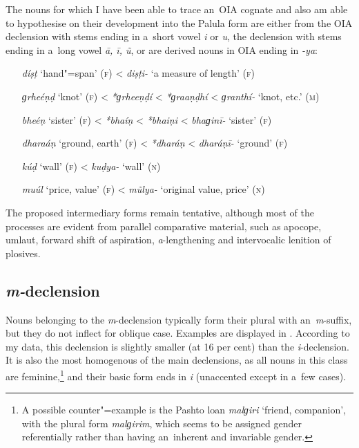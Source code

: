 The nouns for which I have been able to trace an~OIA cognate and also am able to hypothesise on their development into the Palula form are either from the OIA declension with stems ending in a~short vowel \textit{i} or \textit{u}, the declension with stems ending in a~long vowel \textit{ā, ī, ũ}, or are derived nouns in OIA ending in \textit{-ya}: 

\begin{itemize}[itemsep=0pt, leftmargin=]
\item[\textit{díṣṭ} `hand"=span' (\textsc{f})] {\textless} \textit{diṣṭi-} `a measure of length' (\textsc{f})
\item[\textit{ɡrheéṇḍ} `knot' (\textsc{f})] {\textless} \textit{*ɡrheeṇḍí} {\textless} \textit{*ɡraaṇḍhí} {\textless} \textit{ɡranthí-} `knot, etc.' (\textsc{m})
\item[\textit{bheéṇ} `sister' (\textsc{f})] {\textless} \textit{*bhaíṇ} {\textless} \textit{*bhaiṇi} {\textless} \textit{bhaɡinī-} `sister' (\textsc{f})
\item[\textit{dharaáṇ} `ground, earth' (\textsc{f})] {\textless} \textit{*dharáṇ} {\textless} \textit{dharáṇī-} `ground' (\textsc{f})
\item[\textit{kúḍ} `wall' (\textsc{f})] {\textless} \textit{kuḍya-} `wall' (\textsc{n})
\item[\textit{muúl} `price, value' (\textsc{f})] {\textless} \textit{mũlya-} `original value, price' (\textsc{n})
\end{itemize}

The proposed intermediary forms remain tentative, although most of the processes are evident from parallel comparative material, such as apocope, umlaut, forward shift of aspiration, \textit{a}-lengthening and intervocalic lenition of plosives.

\subsection{\textit{m-}declension}
\label{subsec:4-6-3}

Nouns belonging to the \textit{m}-declension typically form their plural with an~\textit{m}-suffix, but they do not inflect for oblique case. Examples are displayed in . According to my data, this declension is slightly smaller (at 16 per cent) than the \textit{i}-declension. It is also the most homogenous of the main declensions, as all nouns in this class are feminine,\footnote{A possible counter"=example is the Pashto loan \textit{malɡiri} `friend, companion', with the plural form \textit{malɡirim}, which seems to be assigned gender referentially rather than having an~inherent and invariable gender.} and their basic form ends in \textit{i} (unaccented except in a~few cases).


